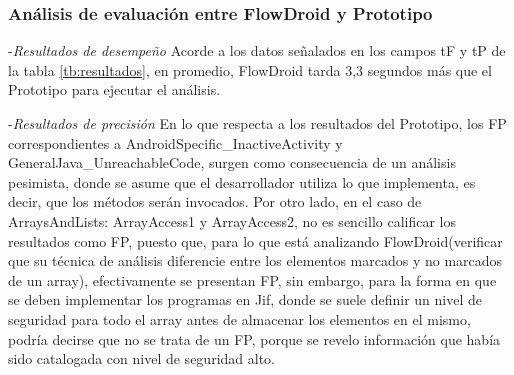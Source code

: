 \subsubsection{Análisis de evaluación entre FlowDroid y Prototipo}
-\textit{Resultados de desempeño}\newline
Acorde a los datos señalados en los campos tF y tP de la tabla
\ref{tb:resultados}, en promedio, FlowDroid tarda 3,3 segundos más que el
Prototipo para ejecutar el análisis.

-\textit{Resultados de precisión}\newline
En lo que respecta a los resultados del Prototipo, los FP correspondientes a
AndroidSpecific\_InactiveActivity y GeneralJava\_UnreachableCode, surgen como
consecuencia de un análisis pesimista, donde se asume que el desarrollador
utiliza lo que implementa, es decir, que los métodos serán invocados.\newline 
Por otro lado, en el caso de ArraysAndLists: ArrayAccess1 y ArrayAccess2, no es
sencillo calificar los resultados como FP, puesto que, para lo que está
analizando FlowDroid(verificar que su técnica de análisis diferencie entre los
elementos marcados y no marcados de un array), efectivamente se presentan FP,
sin embargo, para la forma en que se deben implementar los programas en Jif,
donde se suele definir un nivel de seguridad para todo el array antes de
almacenar los elementos en el mismo, podría decirse que no se trata de un FP,
porque se revelo información que había sido catalogada con nivel de seguridad alto.


